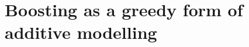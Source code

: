 

\section{Boosting as a greedy form of additive modelling}
\setcounter{theorem}{0}
\setcounter{equation}{0}


\renewcommand{\theenumi}{\roman{enumi}}
\renewcommand{\labelenumi}{\textnormal{(\theenumi)}$\;\;$}


\renewcommand{\theenumi}{\arabic{enumi}}
\renewcommand{\labelenumi}{\textnormal{(\theenumi)}$\;\;$}
\renewcommand{\labelenumii}{\textnormal{(\theenumii)}$\;\;$}


